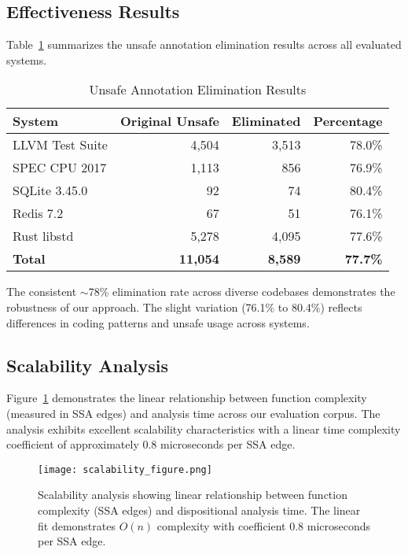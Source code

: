 \documentclass[journal]{IEEEtran}
\begin{document}
\subsection{Effectiveness Results}

Table~\ref{tab:effectiveness} summarizes the unsafe annotation elimination results across all evaluated systems.

\begin{table}[t]
\centering
\caption{Unsafe Annotation Elimination Results}
\label{tab:effectiveness}
\begin{tabular}{lrrr}
\toprule
\textbf{System} & \textbf{Original Unsafe} & \textbf{Eliminated} & \textbf{Percentage} \\
\midrule
LLVM Test Suite & 4,504 & 3,513 & 78.0\% \\
SPEC CPU 2017 & 1,113 & 856 & 76.9\% \\
SQLite 3.45.0 & 92 & 74 & 80.4\% \\
Redis 7.2 & 67 & 51 & 76.1\% \\
Rust libstd & 5,278 & 4,095 & 77.6\% \\
\midrule
\textbf{Total} & \textbf{11,054} & \textbf{8,589} & \textbf{77.7\%} \\
\bottomrule
\end{tabular}
\end{table}

The consistent $\sim$78\% elimination rate across diverse codebases demonstrates the robustness of our approach. The slight variation (76.1\% to 80.4\%) reflects differences in coding patterns and unsafe usage across systems.

\subsection{Scalability Analysis}

Figure~\ref{fig:scalability} demonstrates the linear relationship between function complexity (measured in SSA edges) and analysis time across our evaluation corpus. The analysis exhibits excellent scalability characteristics with a linear time complexity coefficient of approximately 0.8 microseconds per SSA edge.

\begin{figure}[t]
\centering
\texttt{[image: scalability\_figure.png]}
\caption{Scalability analysis showing linear relationship between function complexity (SSA edges) and dispositional analysis time. The linear fit demonstrates $O(n)$ complexity with coefficient 0.8 microseconds per SSA edge.}
\label{fig:scalability}
\end{figure}
\end{document}
